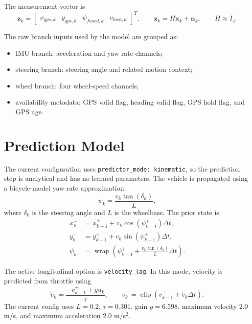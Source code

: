 \documentclass[11pt,a4paper]{article}
\newcommand{\state}{\bm{x}}
\newcommand{\meas}{\bm{z}}
\newcommand{\wrap}{\operatorname{wrap}}
\begin{document}
The measurement vector is
\begin{equation}
  \meas_k =
  \begin{bmatrix}
    x_{gps,k} & y_{gps,k} & \psi_{fused,k} & v_{tach,k}
  \end{bmatrix}^{T},
  \qquad
  \meas_k = H\state_k + \bm{n}_k,
  \qquad
  H \approx I_4 .
\end{equation}

The raw branch inputs used by the model are grouped as:
\begin{itemize}
  \item IMU branch: acceleration and yaw-rate channels;
  \item steering branch: steering angle and related motion context;
  \item wheel branch: four wheel-speed channels;
  \item availability metadata: GPS valid flag, heading valid flag, GPS hold
  flag, and GPS age.
\end{itemize}

\section{Prediction Model}

The current configuration uses \texttt{predictor\_mode: kinematic}, so the
prediction step is analytical and has no learned parameters. The vehicle is
propagated using a bicycle-model yaw-rate approximation:
\begin{equation}
  \dot{\psi}_k = \frac{v_k \tan(\delta_k)}{L},
\end{equation}
where $\delta_k$ is the steering angle and $L$ is the wheelbase. The prior state
is
\begin{align}
  x_k^- &= x_{k-1}^+ + v_k \cos(\psi_{k-1}^+) \Delta t, \\
  y_k^- &= y_{k-1}^+ + v_k \sin(\psi_{k-1}^+) \Delta t, \\
  \psi_k^- &= \wrap\left(
    \psi_{k-1}^+ + \frac{v_k \tan(\delta_k)}{L}\Delta t
  \right).
\end{align}

The active longitudinal option is \texttt{velocity\_lag}. In this mode,
velocity is predicted from throttle using
\begin{equation}
  \dot{v}_k = \frac{-v_{k-1}^+ + g u_k}{\tau},
  \qquad
  v_k^- = \operatorname{clip}\left(v_{k-1}^+ + \dot{v}_k\Delta t\right).
\end{equation}
The current config uses $L=0.2$, $\tau=0.301$, gain $g=6.598$, maximum velocity
$2.0$ m/s, and maximum acceleration $2.0$ m/s$^2$.
\end{document}
